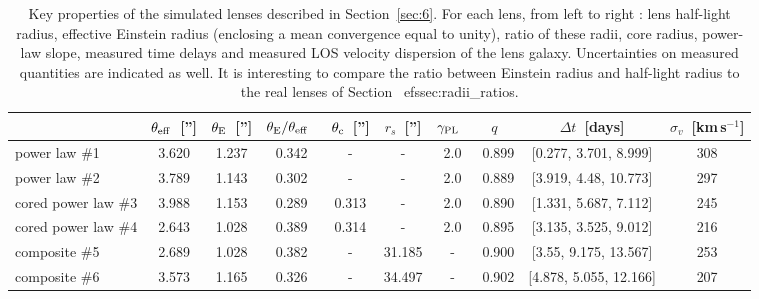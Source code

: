 \begin{table*}[htbp!]
\renewcommand{\arraystretch}{1.5}
\centering
\begin{tabular}{l|c|c|c|c|c|c|c|c|c}
\toprule
{} &  $\theta_{\rm eff}$\ [''] &  $\theta_{\rm E}$\ [''] &  $\theta_{\rm E} / \theta_{\rm eff}$\  &  $\theta_{\rm c}$\ [''] &  $r_{s}$\ [''] &  $\gamma_{\rm PL}$\  &      $q$\  &      $\Delta t$\ [days] &  $\sigma_v$\ [km\,s$^{-1}$] \\
\midrule
power law \#1       &                     3.620 &                   1.237 &                                  0.342 &                       - &              - &                  2.0 &      0.899 &   [0.277, 3.701, 8.999] &                         308 \\
power law \#2       &                     3.789 &                   1.143 &                                  0.302 &                       - &              - &                  2.0 &      0.889 &   [3.919, 4.48, 10.773] &                         297 \\
cored power law \#3 &                     3.988 &                   1.153 &                                  0.289 &                   0.313 &              - &                  2.0 &      0.890 &   [1.331, 5.687, 7.112] &                         245 \\
cored power law \#4 &                     2.643 &                   1.028 &                                  0.389 &                   0.314 &              - &                  2.0 &      0.895 &   [3.135, 3.525, 9.012] &                         216 \\
composite \#5       &                     2.689 &                   1.028 &                                  0.382 &                       - &         31.185 &                    - &      0.900 &   [3.55, 9.175, 13.567] &                         253 \\
composite \#6       &                     3.573 &                   1.165 &                                  0.326 &                       - &         34.497 &                    - &      0.902 &  [4.878, 5.055, 12.166] &                         207 \\
\bottomrule
\end{tabular}
\caption{Key properties of the simulated lenses described in Section~\ref{sec:6}. For each lens, from left to right : lens half-light radius, effective Einstein radius (enclosing a mean convergence equal to unity), ratio of these radii, core radius, power-law slope, measured time delays and measured LOS velocity dispersion of the lens galaxy. Uncertainties on measured quantities are indicated as well. It is interesting to compare the ratio between Einstein radius and half-light radius to the real lenses of Section~
ef{ssec:radii_ratios}. \label{app:mock_params}}
\end{table*}

